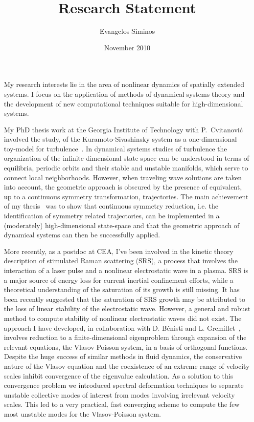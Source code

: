\documentclass[a4paper,10pt]{article}
\title{Research Statement}
\author{Evangelos Siminos}
\date{November 2010}
\begin{document}
\maketitle

My research interests lie in the area of nonlinear dynamics of 
spatially extended systems. I focus on the application
of methods of dynamical systems theory and the development of
new computational techniques suitable for high-dimensional
systems. 

My PhD thesis work at the Georgia Institute of Technology with P.~Cvitanovi\'c
involved the study, of the
Kuramoto-Sivashinsky system as a one-dimensional 
toy-model for turbulence~\cite{SCD07}. 
In dynamical systems studies of turbulence the
organization of the infinite-dimensional state space 
can be understood in terms of equilibria, periodic orbits and their
stable and unstable manifolds, which serve to connect local neighborhoods.
However, when traveling wave solutions are taken into account, the geometric
approach is obscured by the presence of equivalent, up to a continuous symmetry
transformation, trajectories. The main achievement of my
thesis~\cite{SiminosThesis,SiCvi10} was to show that continuous symmetry
reduction, i.e. the identification of symmetry related trajectories, can be
implemented in a (moderately) high-dimensional state-space and that the
geometric approach of dynamical systems can then be successfully applied.

More recently, as a postdoc at CEA, I've been involved in the kinetic theory
description of stimulated Raman scattering (SRS), a process that involves the
interaction of a laser pulse and a nonlinear electrostatic wave in a plasma. SRS
is a major source of energy loss for current inertial confinement efforts, while
a theoretical understanding of the saturation of its growth is still missing. It
has been recently suggested that the saturation of SRS growth may be attributed
to the loss of linear stability of the electrostatic wave. However, a general
and robust method to compute stability of nonlinear electrostatic waves did not
exist. The approach I have developed, in collaboration with D. B\'enisti and L.
Gremillet~\cite{siminos11}, involves reduction to a finite-dimensional
eigenproblem through expansion of the relevant equations, the Vlasov-Poisson
system, in a basis of orthogonal functions. Despite the huge success of
similar methods in fluid dynamics, the conservative nature of the Vlasov
equation and the coexistence of an extreme range of velocity scales inhibit
convergence of the eigenvalue calculation. As a solution to this convergence
problem we introduced spectral deformation techniques
to separate unstable collective modes of interest from modes involving 
irrelevant velocity scales. 
This led to a very practical, fast converging scheme to compute the 
few most unstable modes for the Vlasov-Poisson system.
\end{document}
